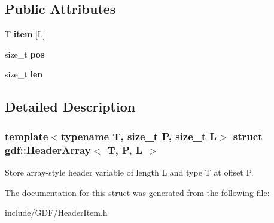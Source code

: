 \subsection*{Public Attributes}
\begin{DoxyCompactItemize}
\item 
\hypertarget{structgdf_1_1_header_array_a872bbeea5c9738988e8f703633f7a27b}{
T {\bfseries item} \mbox{[}L\mbox{]}}
\label{structgdf_1_1_header_array_a872bbeea5c9738988e8f703633f7a27b}

\item 
\hypertarget{structgdf_1_1_header_array_a851b8d7f5ca7098342cca6172ff67d8d}{
size\_\-t {\bfseries pos}}
\label{structgdf_1_1_header_array_a851b8d7f5ca7098342cca6172ff67d8d}

\item 
\hypertarget{structgdf_1_1_header_array_acbb388bc7b071bfd3b578f1740eb81ee}{
size\_\-t {\bfseries len}}
\label{structgdf_1_1_header_array_acbb388bc7b071bfd3b578f1740eb81ee}

\end{DoxyCompactItemize}


\subsection{Detailed Description}
\subsubsection*{template$<$typename T, size\_\-t P, size\_\-t L$>$ struct gdf::HeaderArray$<$ T, P, L $>$}

Store array-\/style header variable of length L and type T at offset P. 

The documentation for this struct was generated from the following file:\begin{DoxyCompactItemize}
\item 
include/GDF/HeaderItem.h\end{DoxyCompactItemize}
